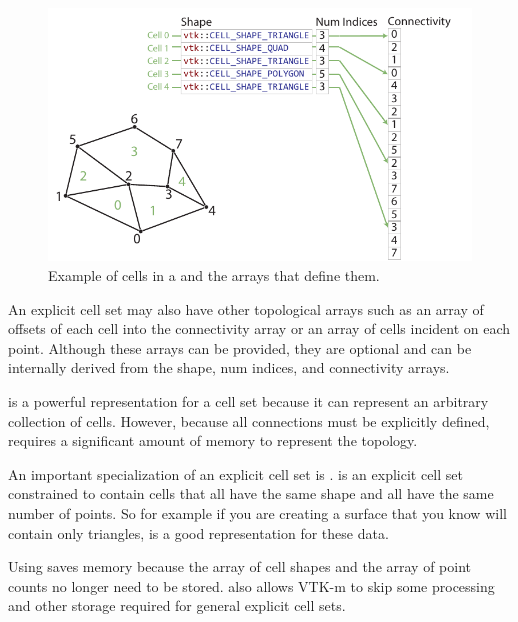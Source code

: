 \begin{figure}[htb]
  \centering
  \includegraphics{images/ExplicitCellConnections}
  \caption{Example of cells in a  and the
    arrays that define them.}
  \label{fig:CellSetExplicit}
\end{figure}

An explicit cell set may also have other topological arrays such as an
array of offsets of each cell into the connectivity array or an array of
cells incident on each point. Although these arrays can be provided, they
are optional and can be internally derived from the shape, num indices, and
connectivity arrays.

 is a powerful representation for a cell set
because it can represent an arbitrary collection of cells. However, because
all connections must be explicitly defined,
 requires a significant amount of memory to
represent the topology.


An important specialization of an explicit cell set is
.  is an
explicit cell set constrained to contain cells that all have the same shape
and all have the same number of points. So for example if you are creating
a surface that you know will contain only triangles,
 is a good representation for these data.

Using  saves memory because the array of
cell shapes and the array of point counts no longer need to be stored.
 also allows VTK-m to skip some
processing and other storage required for general explicit cell sets.

